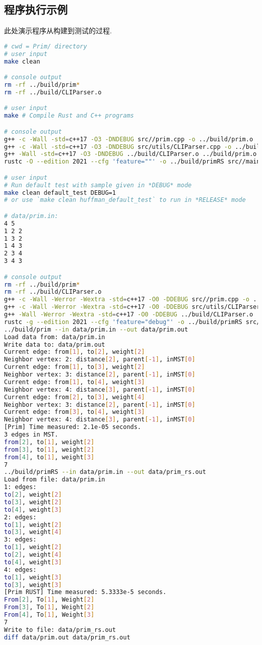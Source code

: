 \subsection{程序执行示例}
\label{sec:dpBench}
此处演示程序从构建到测试的过程.
\begin{lstlisting}[language=bash]
# cwd = Prim/ directory
# user input
make clean

# console output
rm -rf ../build/prim*
rm -rf ../build/CLIParser.o

# user input
make # Compile Rust and C++ programs

# console output
g++ -c -Wall -std=c++17 -O3 -DNDEBUG src//prim.cpp -o ../build/prim.o
g++ -c -Wall -std=c++17 -O3 -DNDEBUG src/utils/CLIParser.cpp -o ../build/CLIParser.o
g++ -Wall -std=c++17 -O3 -DNDEBUG ../build/CLIParser.o ../build/prim.o -o ../build/prim
rustc -O --edition 2021 --cfg 'feature=""' -o ../build/primRS src//main.rs

# user input
# Run default test with sample given in *DEBUG* mode
make clean default_test DEBUG=1
# or use `make clean huffman_default_test` to run in *RELEASE* mode

# data/prim.in:
4 5
1 2 2
1 3 2
1 4 3
2 3 4
3 4 3

# console output
rm -rf ../build/prim*
rm -rf ../build/CLIParser.o
g++ -c -Wall -Werror -Wextra -std=c++17 -O0 -DDEBUG src//prim.cpp -o ../build/prim.o
g++ -c -Wall -Werror -Wextra -std=c++17 -O0 -DDEBUG src/utils/CLIParser.cpp -o ../build/CLIParser.o
g++ -Wall -Werror -Wextra -std=c++17 -O0 -DDEBUG ../build/CLIParser.o ../build/prim.o -o ../build/prim
rustc -g --edition 2021 --cfg 'feature="debug"' -o ../build/primRS src//main.rs
../build/prim --in data/prim.in --out data/prim.out
Load data from: data/prim.in
Write data to: data/prim.out
Current edge: from[1], to[2], weight[2]
Neighbor vertex: 2: distance[2], parent[-1], inMST[0]
Current edge: from[1], to[3], weight[2]
Neighbor vertex: 3: distance[2], parent[-1], inMST[0]
Current edge: from[1], to[4], weight[3]
Neighbor vertex: 4: distance[3], parent[-1], inMST[0]
Current edge: from[2], to[3], weight[4]
Neighbor vertex: 3: distance[2], parent[-1], inMST[0]
Current edge: from[3], to[4], weight[3]
Neighbor vertex: 4: distance[3], parent[-1], inMST[0]
[Prim] Time measured: 2.1e-05 seconds.
3 edges in MST.
from[2], to[1], weight[2]
from[3], to[1], weight[2]
from[4], to[1], weight[3]
7
../build/primRS --in data/prim.in --out data/prim_rs.out
Load from file: data/prim.in
1: edges:
to[2], weight[2]
to[3], weight[2]
to[4], weight[3]
2: edges:
to[1], weight[2]
to[3], weight[4]
3: edges:
to[1], weight[2]
to[2], weight[4]
to[4], weight[3]
4: edges:
to[1], weight[3]
to[3], weight[3]
[Prim RUST] Time measured: 5.3333e-5 seconds.
From[2], To[1], Weight[2]
From[3], To[1], Weight[2]
From[4], To[1], Weight[3]
7
Write to file: data/prim_rs.out
diff data/prim.out data/prim_rs.out


\end{lstlisting}
